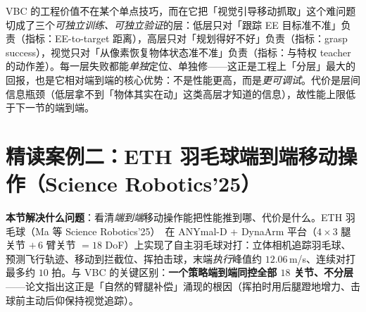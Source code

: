 \begin{insight}\label{ins:rlmc-lm-vbc-layers}
VBC 的工程价值不在某个单点技巧，而在它把「视觉引导移动抓取」这个难问题切成了三个\emph{可独立训练、可独立验证}的层：低层只对「跟踪 EE 目标准不准」负责（指标：EE-to-target 距离），高层只对「规划得好不好」负责（指标：grasp success），视觉只对「从像素恢复物体状态准不准」负责（指标：与特权 teacher 的动作差）。每一层失败都能\emph{单独}定位、单独修——这正是工程上「分层」最大的回报，也是它相对端到端的核心优势：不是性能更高，而是\emph{更可调试}。代价是层间信息瓶颈（低层拿不到「物体其实在动」这类高层才知道的信息），故性能上限低于下一节的端到端。
\end{insight}

\begin{practice}[练习·VBC 精读]
\end{practice}

\section{精读案例二：ETH 羽毛球端到端移动操作（Science Robotics'25）}
\label{sec:rlmc-lm-eth}

\textbf{本节解决什么问题}：看清\emph{端到端}移动操作能把性能推到哪、代价是什么。ETH 羽毛球（Ma 等 Science Robotics'25）\,\cite{ma2025badminton} 在 ANYmal-D + DynaArm 平台（$4\times3$ 腿关节 $+\,6$ 臂关节 $=18$ DoF）上实现了自主羽毛球对打：立体相机追踪羽毛球、预测飞行轨迹、移动到拦截位、挥拍击球，末端\emph{执行}峰值约 $12.06\,$m/s、连续对打最多约 $10$ 拍。与 VBC 的关键区别：\textbf{一个策略端到端同控全部 $18$ 关节、不分层}——论文指出这正是「自然的臂腿补偿」涌现的根因（挥拍时用后腿蹬地增力、击球前主动后仰保持视觉追踪）。

